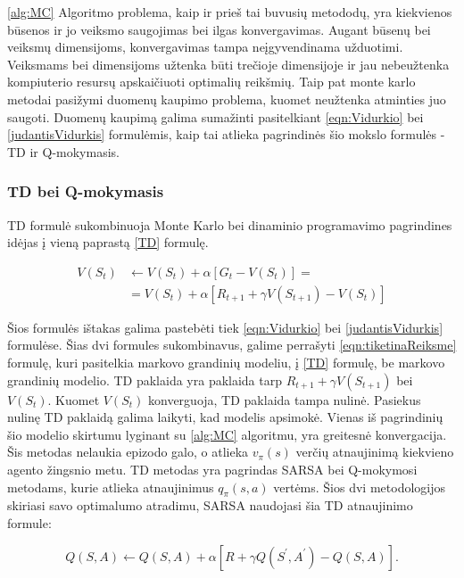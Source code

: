 \documentclass[a4paper, 12pt]{article}
\begin{document}
\ref{alg:MC} Algoritmo problema, kaip ir prieš tai buvusių metododų, yra kiekvienos būsenos ir jo veiksmo saugojimas bei ilgas konvergavimas. Augant būsenų bei veiksmų dimensijoms, konvergavimas tampa neįgyvendinama užduotimi. Veiksmams bei dimensijoms užtenka būti trečioje dimensijoje ir jau nebeužtenka kompiuterio resursų apskaičiuoti optimalių reikšmių. Taip pat monte karlo metodai pasižymi duomenų kaupimo problema, kuomet neužtenka atminties juo saugoti. Duomenų kaupimą galima sumažinti pasitelkiant \ref{eqn:Vidurkio} bei \ref{judantisVidurkis} formulėmis, kaip tai atlieka pagrindinės šio mokslo formulės - TD ir Q-mokymasis.

\subsubsection{TD bei Q-mokymasis}

TD formulė sukombinuoja Monte Karlo bei dinaminio programavimo pagrindines idėjas į vieną paprastą \ref{TD} formulę. 

\begin{equation}
\label{TD}
\begin{aligned}
V\left(S_{t}\right) &\leftarrow V\left(S_{t}\right)+\alpha\left[G_{t}-V\left(S_{t}\right)\right] = \\
& = V\left(S_{t}\right)+\alpha\left[R_{t+1}+\gamma V\left(S_{t+1}\right)-V\left(S_{t}\right)\right]
\end{aligned}
\end{equation}

Šios formulės ištakas galima pastebėti tiek \ref{eqn:Vidurkio} bei \ref{judantisVidurkis} formulėse. Šias dvi formules sukombinavus, galime perrašyti \ref{eqn:tiketinaReiksme} formulę, kuri pasitelkia markovo grandinių modeliu, į \ref{TD} formulę, be markovo grandinių modelio. TD paklaida yra paklaida tarp $R_{t+1}+\gamma V\left(S_{t+1}\right)$ bei $V\left(S_{t}\right)$. Kuomet $V\left(S_{t}\right)$ konverguoja, TD paklaida tampa nulinė. Pasiekus nulinę TD paklaidą galima laikyti, kad modelis apsimokė. Vienas iš pagrindinių šio modelio skirtumu lyginant su \ref{alg:MC} algoritmu, yra greitesnė konvergacija. Šis metodas nelaukia epizodo galo, o atlieka $v_{\pi}(s)$ verčių atnaujinimą kiekvieno agento žingsnio metu. TD metodas yra pagrindas SARSA bei Q-mokymosi metodams, kurie atlieka atnaujinimus $q_{\pi}(s, a)$ vertėms. Šios dvi metodologijos skiriasi savo optimalumo atradimu, SARSA naudojasi šia TD atnaujinimo formule:

\begin{equation}
Q(S, A) \leftarrow Q(S, A)+\alpha\left[R+\gamma Q\left(S^{\prime}, A^{\prime}\right)-Q(S, A)\right].
\end{equation}
\end{document}
